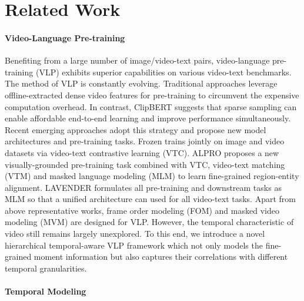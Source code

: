 \documentclass[10pt,twocolumn,letterpaper]{article}
\begin{document}
\section{Related Work}

\paragraph{Video-Language Pre-training}

Benefiting from a large number of image/video-text pairs, video-language pre-training (VLP) exhibits superior capabilities on various video-text benchmarks. The method of VLP is constantly evolving. Traditional approaches \cite{sun2019videobert, zhu2020actbert, luo2020univl, li2020hero} leverage offline-extracted dense video features for pre-training to circumvent the expensive computation overhead. In contrast, ClipBERT \cite{lei2021clipbert} suggests that sparse sampling can enable affordable end-to-end learning and improve performance simultaneously. Recent emerging approaches \cite{bain2021frozen, li2022alpro, ge2022bridgeformer, lei2021clipbert, huang2022clover, li2022lavender} adopt this strategy and propose new model architectures and pre-training tasks. Frozen \cite{bain2021frozen} trains jointly on image and video datasets via video-text contrastive learning (VTC). ALPRO \cite{li2022alpro} proposes a new visually-grounded pre-training task combined with VTC, video-text matching (VTM) and masked language modeling (MLM) \cite{devlin2018bert} to learn fine-grained region-entity alignment. LAVENDER \cite{li2022lavender} formulates all pre-training and downstream tasks as MLM so that a unified architecture can used for all video-text tasks. Apart from above representative works, frame order modeling (FOM) \cite{li2020hero, zellers2021merlot} and masked video modeling (MVM) \cite{fu2021violet} are designed for VLP. 
However, the temporal characteristic of video still remains largely unexplored. To this end, we introduce a novel hierarchical temporal-aware VLP framework which not only models the fine-grained moment information but also captures their correlations with different temporal granularities.

\paragraph{Temporal Modeling}
\end{document}
